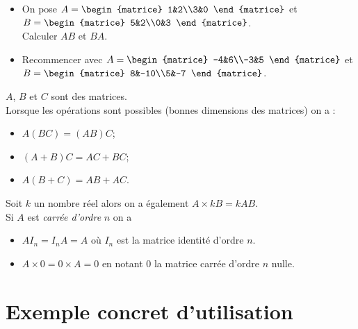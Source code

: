 \begin{exercice}[]
	\begin{itemize}
		\item 	On pose $A=\begin{matrice}
				      1&2\\3&0
			      \end{matrice}$ et $B=\begin{matrice}
				      5&2\\0&3
			      \end{matrice}$.\\
		      
		      Calculer $AB$ et $BA$.
		      
		\item 	Recommencer avec $A=\begin{matrice}
				      -4&6\\-3&5
			      \end{matrice}$ et $B=\begin{matrice}
				      8&-10\\5&-7
			      \end{matrice}$.
	\end{itemize}
\end{exercice}

\begin{propriete}[s de calcul]
	
	$A$, $B$ et $C$ sont des matrices.\\
	Lorsque les opérations sont possibles (bonnes dimensions des matrices) on a :
	\begin{itemize}
		\item 	$A(BC)=(AB)C$;
		\item 	$(A+B)C=AC+BC$;
		\item 	$A(B+C)=AB+AC$.\\
	\end{itemize}
	Soit $k$ un nombre réel alors on a également $A\times kB=kAB$.\\
	
	Si $A$ est \textit{carrée d'ordre} $n$ on a
	\begin{itemize}
		\item 	$AI_n=I_nA=A$ où $I_n$ est la matrice identité d'ordre $n$.
		\item 	$A\times 0=0\times A=0$ en notant 0 la matrice carrée d'ordre $n$ nulle.
	\end{itemize}
\end{propriete}

\section{Exemple concret d'utilisation}


